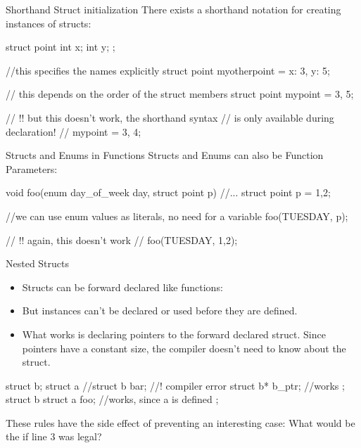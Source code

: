 \documentclass[10pt,graphics,aspectratio=169,table]{beamer}
\begin{document}
\begin{frame}[fragile]{Shorthand Struct initialization}
    There exists a shorthand notation for creating instances of structs:
    \begin{codeblock}
struct point{
    int x;
    int y;
}; 

//this specifies the names explicitly
struct point myotherpoint = {x: 3, y: 5};

// this depends on the order of the struct members
struct point mypoint = {3, 5};

// !! but this doesn't work, the shorthand syntax
// is only available during declaration!
// mypoint = {3, 4};
    \end{codeblock}

\end{frame}

\begin{frame}[fragile]{Structs and Enums in Functions}
    Structs and Enums can also be Function Parameters:
    \begin{codeblock}
void foo(enum day_of_week day, struct point p){ 
    //...
}
struct point p = {1,2};

//we can use enum values as literals, no need for a variable
foo(TUESDAY, p);

// !! again, this doesn't work
// foo(TUESDAY, {1,2});

    \end{codeblock}
\end{frame}


\begin{frame}[fragile]{Nested Structs}
    \begin{itemize}
        \item Structs can be forward declared like functions: 
        \item But instances can't be declared or used before they are defined.
        \item 
             What works is declaring pointers to the forward declared struct.
             Since pointers have a constant size, the compiler doesn't need to
             know about the struct.
    \end{itemize}
 
     \begin{codeblock}
 struct b;
 struct a{
     //struct b bar; //! compiler error
     struct b* b_ptr; //works
 };
 struct b{
     struct a foo; //works, since a is defined
 };
     \end{codeblock}
 
     These rules have the side effect of preventing an interesting case:
     What would be the  if line 3 was legal?
 \end{frame}
\end{document}
